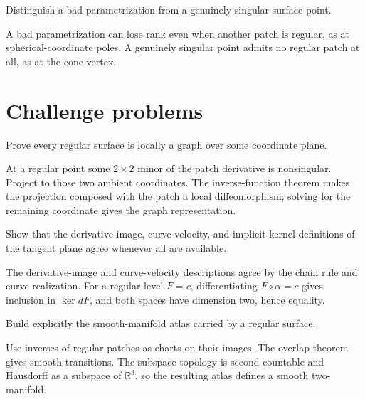 \begin{problem}\label{prob:vii14-12}
Distinguish a bad parametrization from a genuinely singular surface point.
\end{problem}
\begin{solution}
A bad parametrization can lose rank even when another patch is regular, as at spherical-coordinate poles. A genuinely singular point admits no regular patch at all, as at the cone vertex.
\end{solution}

\section{Challenge problems}
\begin{problem}\label{prob:vii14-ch01}
Prove every regular surface is locally a graph over some coordinate plane.
\end{problem}
\begin{solution}
At a regular point some \(2\times2\) minor of the patch derivative is nonsingular. Project to those two ambient coordinates. The inverse-function theorem makes the projection composed with the patch a local diffeomorphism; solving for the remaining coordinate gives the graph representation.
\end{solution}

\begin{problem}\label{prob:vii14-ch02}
Show that the derivative-image, curve-velocity, and implicit-kernel definitions of the tangent plane agree whenever all are available.
\end{problem}
\begin{solution}
The derivative-image and curve-velocity descriptions agree by the chain rule and curve realization. For a regular level \(F=c\), differentiating \(F\circ\alpha=c\) gives inclusion in \(\ker dF\), and both spaces have dimension two, hence equality.
\end{solution}

\begin{problem}\label{prob:vii14-ch03}
Build explicitly the smooth-manifold atlas carried by a regular surface.
\end{problem}
\begin{solution}
Use inverses of regular patches as charts on their images. The overlap theorem gives smooth transitions. The subspace topology is second countable and Hausdorff as a subspace of \(\mathbb R^3\), so the resulting atlas defines a smooth two-manifold.
\end{solution}

